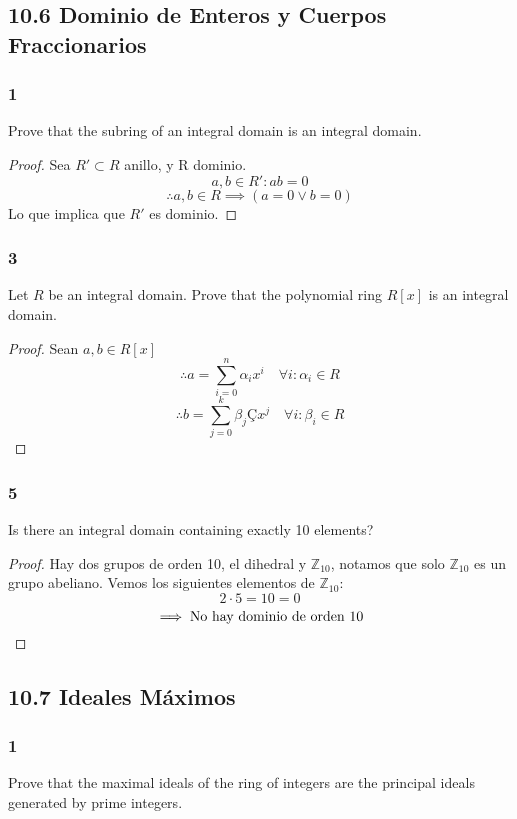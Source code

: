 \documentclass[11pt]{article}
\newcommand{\set}[1]{\mathbb{#1}}
\theoremstyle{definition}
\begin{document}
        \subsection{10.6 Dominio de Enteros y Cuerpos Fraccionarios}
        \subsubsection{1}
        Prove that the subring of an integral domain is an integral domain.
        \begin{proof}
            Sea $R'\subset R$ anillo, y R dominio.
            \[a,b\in R': ab=0\]
            \[\therefore a,b\in R\implies(a=0\vee b=0)\]
            Lo que implica que $R'$ es dominio.
        \end{proof}

        \subsubsection{3}
        Let $R$ be an integral domain. Prove that the polynomial ring $R[x]$ is an integral domain.
        \begin{proof}
            Sean $a,b\in R[x]$
            \[\therefore a=\sum^n_{i=0}\alpha_ix^i\quad \forall i:\alpha_i\in R\]
            \[\therefore b=\sum^k_{j=0}\beta_jÇx^j\quad \forall i:\beta_i\in R\]
        \end{proof}

        \subsubsection{5}
        Is there an integral domain containing exactly 10 elements?
        \begin{proof}
            Hay dos grupos de orden 10, el dihedral y $\set{Z}_{10}$, notamos que solo $\set{Z}_{10}$ es un grupo abeliano. Vemos los siguientes elementos de $\set{Z}_{10}$:
            \[2\cdot 5=10=0\]
            \[\implies \textrm{No hay dominio de orden 10}\qedhere\]
        \end{proof}

        \subsection{10.7 Ideales Máximos}
        \subsubsection{1}
        Prove that the maximal ideals of the ring of integers are the principal ideals generated by prime integers.
\end{document}
